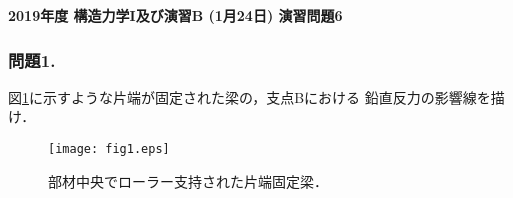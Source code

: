 \documentclass[10pt,a4j]{jarticle}
\newlength{\minitwocolumn}
\begin{document}
\newcommand{\fat}[1]{\mbox{\boldmath $#1$}}
\newcommand{\D}{\partial}
\newcommand{\w}{\omega}
\newcommand{\ga}{\alpha}
\newcommand{\gb}{\beta}
\newcommand{\gx}{\xi}
\newcommand{\gz}{\zeta}
\newcommand{\vhat}[1]{\hat{\fat{#1}}}
\newcommand{\spc}{\vspace{0.7\baselineskip}}
\newcommand{\halfspc}{\vspace{0.3\baselineskip}}

\pagestyle{empty}
\newcommand{\twofig}[2]
 {
   \begin{figure}[h]
     \begin{minipage}[t]{\minitwocolumn}
         \begin{center}   #1
         \end{center}
     \end{minipage}
         \hspace{\columnsep}
     \begin{minipage}[t]{\minitwocolumn}
         \begin{center} #2
         \end{center}
     \end{minipage}
   \end{figure}
 }
\begin{center}
{\Large \bf 2019年度 構造力学I及び演習B (1月24日) 演習問題6} \\
\end{center}
\subsubsection*{問題1.}
図\ref{fig:fig1}に示すような片端が固定された梁の，支点Bにおける
鉛直反力の影響線を描け．
\begin{figure}[h]
	\begin{center}
	\texttt{[image: fig1.eps]} 
	\end{center}
	\caption{部材中央でローラー支持された片端固定梁．} 
	\label{fig:fig1}
\end{figure}
%
\end{document}
